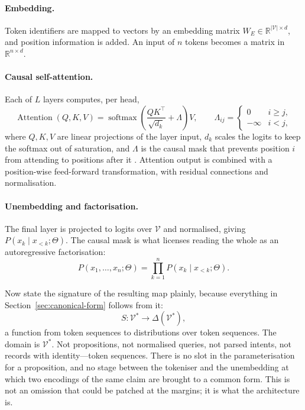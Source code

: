 \documentclass[11pt]{article}
\theoremstyle{plain}
\theoremstyle{definition}
\begin{document}
\paragraph{Embedding.} Token identifiers are mapped to vectors by an embedding
matrix $W_E \in \mathbb{R}^{|\mathcal{V}| \times d}$, and position information is
added. An input of $n$ tokens becomes a matrix in $\mathbb{R}^{n \times d}$.

\paragraph{Causal self-attention.} Each of $L$ layers computes, per head,
\begin{equation}
  \operatorname{Attention}(Q, K, V)
  = \operatorname{softmax}\!\left(\frac{QK^{\top}}{\sqrt{d_k}} + \Lambda\right) V,
  \qquad
  \Lambda_{ij} = \begin{cases} 0 & i \ge j,\\ -\infty & i < j,\end{cases}
  \label{eq:attention}
\end{equation}
where $Q, K, V$ are linear projections of the layer input, $d_k$ scales the logits
to keep the softmax out of saturation, and $\Lambda$ is the causal mask that
prevents position $i$ from attending to positions after it
\citep{vaswani2017}. Attention output is combined with a position-wise
feed-forward transformation, with residual connections and normalisation.

\paragraph{Unembedding and factorisation.} The final layer is projected to logits
over $\mathcal{V}$ and normalised, giving $P(x_k \mid x_{<k}; \Theta)$. The causal
mask is what licenses reading the whole as an autoregressive factorisation:
\begin{equation}
  P(x_1, \ldots, x_n; \Theta) = \prod_{k=1}^{n} P(x_k \mid x_{<k}; \Theta).
  \label{eq:factorisation}
\end{equation}

Now state the signature of the resulting map plainly, because everything in
Section~\ref{sec:canonical-form} follows from it:
\begin{equation}
  S : \mathcal{V}^{*} \longrightarrow \Delta(\mathcal{V}^{*}),
  \label{eq:signature}
\end{equation}
a function from token sequences to distributions over token sequences. The domain
is $\mathcal{V}^{*}$. Not propositions, not normalised queries, not parsed
intents, not records with identity---token sequences. There is no slot in the
parameterisation for a proposition, and no stage between the tokeniser and the
unembedding at which two encodings of the same claim are brought to a common form.
This is not an omission that could be patched at the margins; it is what the
architecture is.
\end{document}

